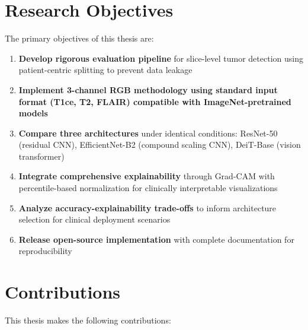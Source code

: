 \section{Research Objectives}

The primary objectives of this thesis are:

\begin{enumerate}
    \item \textbf{Develop rigorous evaluation pipeline} for slice-level tumor detection using patient-centric splitting to prevent data leakage
    
    \item \textbf{Implement 3-channel RGB methodology using standard input format (T1ce, T2, FLAIR) compatible with ImageNet-pretrained models}
    
    \item \textbf{Compare three architectures} under identical conditions: ResNet-50 (residual CNN), EfficientNet-B2 (compound scaling CNN), DeiT-Base (vision transformer)
    
    \item \textbf{Integrate comprehensive explainability} through Grad-CAM with percentile-based normalization for clinically interpretable visualizations
    
    \item \textbf{Analyze accuracy-explainability trade-offs} to inform architecture selection for clinical deployment scenarios
    
    \item \textbf{Release open-source implementation} with complete documentation for reproducibility
\end{enumerate}

\section{Contributions}

This thesis makes the following contributions:


